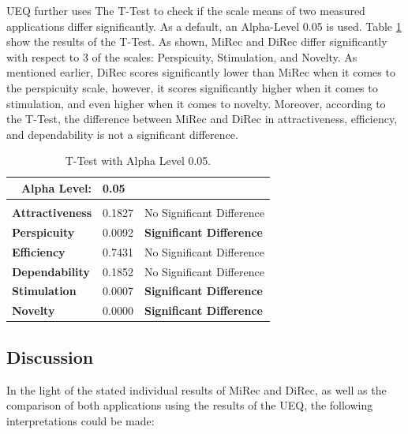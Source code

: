 UEQ further uses The T-Test to check if the scale means of two measured
applications differ significantly. As a default, an Alpha-Level 0.05 is used.
Table \ref{table:table53} show the results of the T-Test. As shown, MiRec and
DiRec differ significantly with respect to 3 of the scales: Perspicuity,
Stimulation, and Novelty. As mentioned earlier, DiRec scores significantly lower
than MiRec when it comes to the perspicuity scale, however, it scores
significantly higher when it comes to stimulation, and even higher when it
comes to novelty. Moreover, according to the T-Test, the difference between
MiRec and DiRec in attractiveness, efficiency, and dependability is not a
significant difference.

\begin{table}[!htbp]

\centering
\begin{tabular}{|l|l|l|}
\hline
\multicolumn{1}{|r|}{Alpha Level:} & 0.05   &                                                         \\ \hline
                                   &        &                                                         \\ \hline
\textbf{Attractiveness}            & 0.1827 & No Significant Difference       \\ \hline
\textbf{Perspicuity}               & 0.0092 & \textbf{Significant Difference} \\ \hline
\textbf{Efficiency}                & 0.7431 & No Significant Difference       \\ \hline
\textbf{Dependability}             & 0.1852 & No Significant Difference       \\ \hline
\textbf{Stimulation}               & 0.0007 & \textbf{Significant Difference} \\ \hline
\textbf{Novelty}                   & 0.0000 & \textbf{Significant Difference} \\ \hline
\end{tabular}
\caption{T-Test with Alpha Level 0.05.}
\label{table:table53}
\end{table} 

\subsection{Discussion}
In the light of the stated individual results of MiRec and DiRec, as well as the
comparison of both applications using the results of the UEQ, the following
interpretations could be made:
